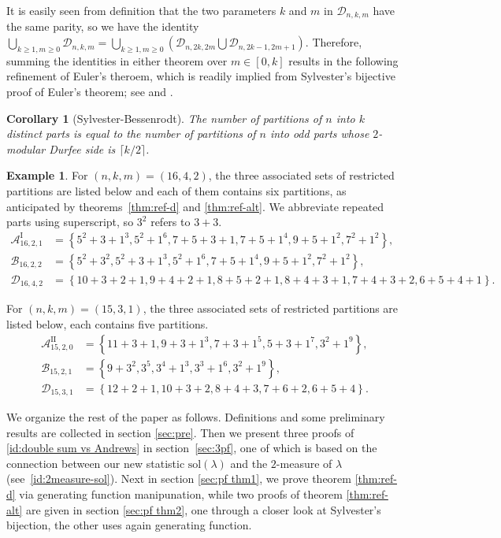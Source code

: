 \documentclass[11pt,reqno]{amsart}
\numberwithin{equation}{section}
\theoremstyle{plain}
\newtheorem{corollary}[theorem]{Corollary}
\theoremstyle{definition}
\newtheorem{example}[theorem]{Example}
\theoremstyle{named}
\newcommand{\set}[1]{\left\{#1\right\}}
\def\cD{\mathcal{D}}
\def\Ao{\mathcal{A}^{\mathrm{I}}}
\def\A2{\mathcal{A}^{\mathrm{II}}}
\def\cB{\mathcal{B}}
\def\sol{\mathrm{sol}}
\begin{document}
It is easily seen from definition that the two parameters $k$ and $m$ in $\cD_{n,k,m}$ have the same parity, so we have the identity $\bigcup_{k\ge 1,m\ge 0}\cD_{n,k,m}=\bigcup_{k\ge 1,m\ge 0}(\cD_{n,2k,2m}\bigcup\cD_{n,2k-1,2m+1})$. Therefore, summing the identities in either theorem over $m\in[0,k]$ results in the following refinement of Euler's theroem, which is readily implied from Sylvester's bijective proof of Euler's theorem; see \cite[Propositions 2.2]{bes94} and \cite[Theorem 1]{zen05}.
\begin{corollary}[Sylvester-Bessenrodt]
The number of partitions of $n$ into $k$ distinct parts is equal to the number of partitions of $n$ into odd parts whose $2$-modular Durfee side is $\lceil k/2\rceil$.
\end{corollary}
\begin{example}
For $(n,k,m)=(16,4,2)$, the three associated sets of restricted partitions are listed below and each of them contains six partitions, as anticipated by theorems~\ref{thm:ref-d} and \ref{thm:ref-alt}. We abbreviate repeated parts using superscript, so $3^2$ refers to $3+3$.
\begin{align*}
\Ao_{16,2,1} &= \set{5^2+3+1^3,5^2+1^6,7+5+3+1,7+5+1^4,9+5+1^2,7^2+1^2},\\
\cB_{16,2,2} &= \set{5^2+3^2,5^2+3+1^3,5^2+1^6,7+5+1^4,9+5+1^2,7^2+1^2},\\
\cD_{16,4,2} &= \set{10+3+2+1, 9+4+2+1, 8+5+2+1, 8+4+3+1, 7+4+3+2, 6+5+4+1}.
\end{align*}

For $(n,k,m)=(15,3,1)$, the three associated sets of restricted partitions are listed below, each contains five partitions.
\begin{align*}
\A2_{15,2,0} &= \set{11+3+1, 9+3+1^3, 7+3+1^5, 5+3+1^7, 3^2+1^9},\\
\cB_{15,2,1} &= \set{9+3^2, 3^5, 3^4+1^3, 3^3+1^6, 3^2+1^9},\\
\cD_{15,3,1} &= \set{12+2+1, 10+3+2, 8+4+3, 7+6+2, 6+5+4}.
\end{align*}
\end{example}

We organize the rest of the paper as follows. Definitions and some preliminary results are collected in section \ref{sec:pre}. Then we present three proofs of \eqref{id:double sum vs Andrews} in section~\ref{sec:3pf}, one of which is based on the connection between our new statistic $\sol(\lambda)$ and the $2$-measure of $\lambda$ (see~\eqref{id:2measure-sol}). Next in section \ref{sec:pf thm1}, we prove theorem \ref{thm:ref-d} via generating function manipunation, while two proofs of theorem \ref{thm:ref-alt} are given in section \ref{sec:pf thm2}, one through a closer look at Sylvester's bijection, the other uses again generating function.
\end{document}
